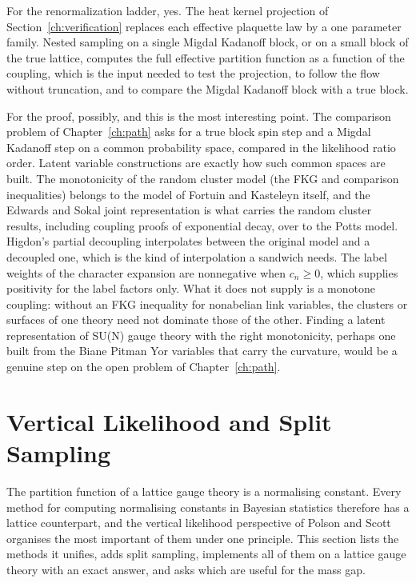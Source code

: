 For the renormalization ladder, yes. The heat kernel projection of Section~\ref{ch:verification} replaces each effective plaquette law by a one parameter family. Nested sampling on a single Migdal Kadanoff block, or on a small block of the true lattice, computes the full effective partition function as a function of the coupling, which is the input needed to test the projection, to follow the flow without truncation, and to compare the Migdal Kadanoff block with a true block.

For the proof, possibly, and this is the most interesting point. The comparison problem of Chapter~\ref{ch:path} asks for a true block spin step and a Migdal Kadanoff step on a common probability space, compared in the likelihood ratio order. Latent variable constructions are exactly how such common spaces are built. The monotonicity of the random cluster model (the FKG and comparison inequalities) belongs to the model of Fortuin and Kasteleyn itself, and the Edwards and Sokal joint representation is what carries the random cluster results, including coupling proofs of exponential decay, over to the Potts model. Higdon's partial decoupling interpolates between the original model and a decoupled one, which is the kind of interpolation a sandwich needs. The label weights of the character expansion are nonnegative when $c_n\ge0$, which supplies positivity for the label factors only. What it does not supply is a monotone coupling: without an FKG inequality for nonabelian link variables, the clusters or surfaces of one theory need not dominate those of the other. Finding a latent representation of SU(N) gauge theory with the right monotonicity, perhaps one built from the Biane Pitman Yor variables \cite{BPY} that carry the curvature, would be a genuine step on the open problem of Chapter~\ref{ch:path}.

\section{Vertical Likelihood and Split Sampling}\label{ch:vertical}

The partition function of a lattice gauge theory is a normalising constant. Every method for computing normalising constants in Bayesian statistics therefore has a lattice counterpart, and the vertical likelihood perspective of Polson and Scott \cite{PSvl} organises the most important of them under one principle. This section lists the methods it unifies, adds split sampling, implements all of them on a lattice gauge theory with an exact answer, and asks which are useful for the mass gap.

